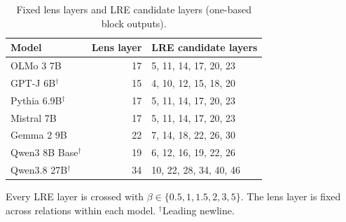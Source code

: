 \begin{table}[t]
\centering\small
\caption{Fixed lens layers and LRE candidate layers (one-based block outputs).}
\label{tab:full-parameters}
\begin{tabular}{@{}lrl@{}}
\toprule
Model & Lens layer & LRE candidate layers \\
\midrule
OLMo 3 7B & 17 & 5, 11, 14, 17, 20, 23 \\
GPT-J 6B$^{\dagger}$ & 15 & 4, 10, 12, 15, 18, 20 \\
Pythia 6.9B$^{\dagger}$ & 17 & 5, 11, 14, 17, 20, 23 \\
Mistral 7B & 17 & 5, 11, 14, 17, 20, 23 \\
Gemma 2 9B & 22 & 7, 14, 18, 22, 26, 30 \\
Qwen3 8B Base$^{\dagger}$ & 19 & 6, 12, 16, 19, 22, 26 \\
Qwen3.8 27B$^{\dagger}$ & 34 & 10, 22, 28, 34, 40, 46 \\
\bottomrule
\end{tabular}
\par\smallskip\begin{minipage}{\linewidth}\footnotesize Every LRE layer is crossed with $\beta\in\{0.5,1,1.5,2,3,5\}$. The lens layer is fixed across relations within each model. $^{\dagger}$Leading newline.\end{minipage}
\end{table}
